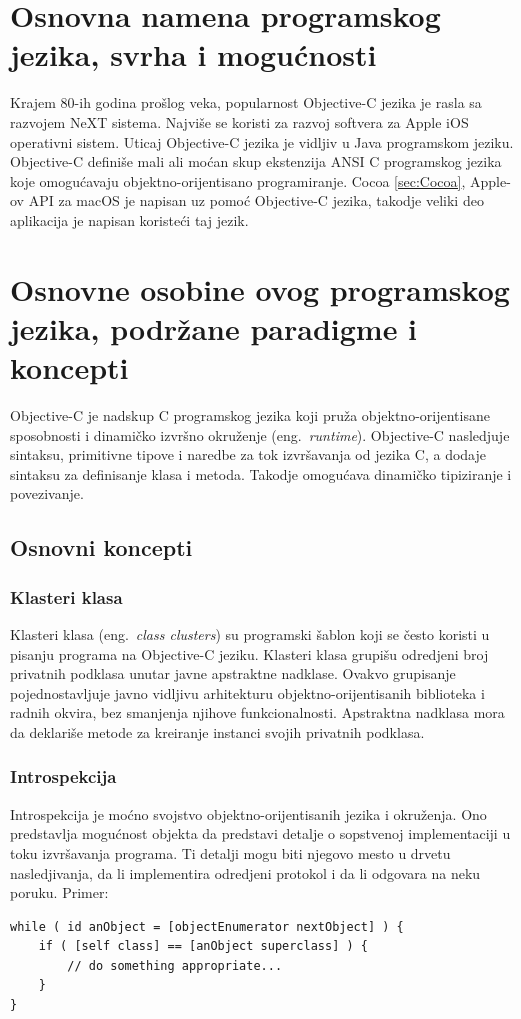 \documentclass[a4paper]{article}
\begin{document}
{\section{Osnovna namena programskog jezika, svrha i mogućnosti}
\label{sec:namena}
Krajem 80-ih godina prošlog veka, popularnost Objective-C jezika je rasla sa razvojem NeXT sistema. Najviše se koristi za razvoj softvera za Apple iOS operativni sistem. Uticaj Objective-C jezika je vidljiv u Java programskom jeziku.
Objective-C definiše mali ali moćan skup ekstenzija ANSI C programskog jezika koje omogućavaju objektno-orijentisano programiranje. Cocoa \ref{sec:Cocoa}, Apple-ov API za macOS je napisan uz pomoć Objective-C jezika, takodje veliki deo aplikacija je napisan koristeći taj jezik. 

\section{Osnovne osobine ovog programskog jezika, podržane paradigme i koncepti}
\label{sec:osobine}
Objective-C je nadskup C programskog jezika koji pruža objektno-orijentisane sposobnosti i dinamičko izvršno okruženje (eng.~{\em runtime}). Objective-C nasledjuje sintaksu, primitivne tipove i naredbe za tok izvršavanja od jezika C, a dodaje sintaksu za definisanje klasa i metoda. Takodje omogućava dinamičko tipiziranje i povezivanje.
\subsection{Osnovni koncepti}
\subsubsection{Klasteri klasa}
Klasteri klasa (eng.~{\em class clusters}) su programski šablon koji se često koristi u pisanju programa na Objective-C jeziku. Klasteri klasa grupišu odredjeni broj privatnih podklasa unutar javne apstraktne nadklase. 
Ovakvo grupisanje pojednostavljuje javno vidljivu arhitekturu objektno-orijentisanih biblioteka i radnih okvira, bez smanjenja njihove funkcionalnosti. Apstraktna nadklasa mora da deklariše metode za kreiranje instanci svojih privatnih podklasa. 
\subsubsection{Introspekcija}
Introspekcija je moćno svojstvo objektno-orijentisanih jezika i okruženja. Ono predstavlja mogućnost objekta da predstavi detalje o sopstvenoj implementaciji u toku izvršavanja programa. Ti detalji mogu biti njegovo mesto u drvetu nasledjivanja, da li implementira odredjeni protokol i da li odgovara na neku poruku. Primer: 
\begin{lstlisting}[frame=single]
while ( id anObject = [objectEnumerator nextObject] ) {
    if ( [self class] == [anObject superclass] ) {
        // do something appropriate...
    }
}
\end{lstlisting}
}
\end{document}
